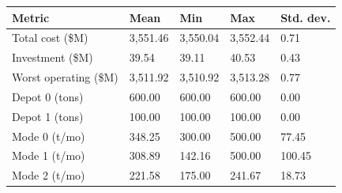 \begin{tabular}{lllll}
\toprule
Metric & Mean & Min & Max & Std. dev. \\
\midrule
Total cost (\$M) & 3,551.46 & 3,550.04 & 3,552.44 & 0.71 \\
Investment (\$M) & 39.54 & 39.11 & 40.53 & 0.43 \\
Worst operating (\$M) & 3,511.92 & 3,510.92 & 3,513.28 & 0.77 \\
Depot 0 (tons) & 600.00 & 600.00 & 600.00 & 0.00 \\
Depot 1 (tons) & 100.00 & 100.00 & 100.00 & 0.00 \\
Mode 0 (t/mo) & 348.25 & 300.00 & 500.00 & 77.45 \\
Mode 1 (t/mo) & 308.89 & 142.16 & 500.00 & 100.45 \\
Mode 2 (t/mo) & 221.58 & 175.00 & 241.67 & 18.73 \\
\bottomrule
\end{tabular}
